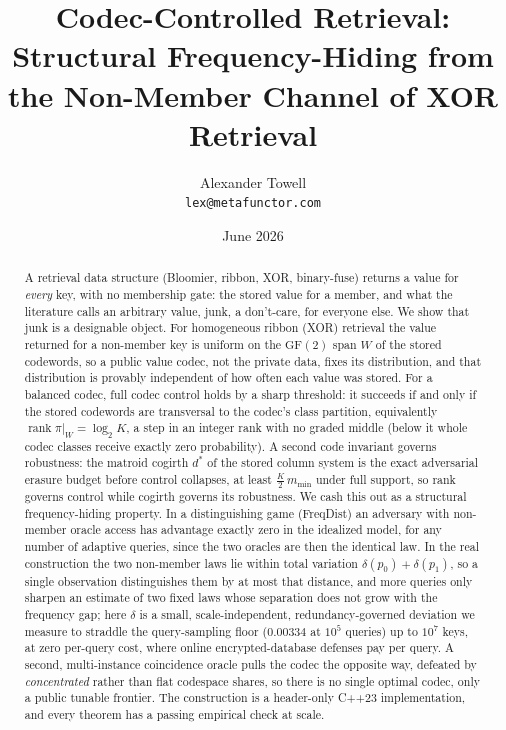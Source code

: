 \documentclass[11pt]{article}
\title{Codec-Controlled Retrieval:\\
Structural Frequency-Hiding from the Non-Member Channel of XOR Retrieval}
\author{Alexander Towell\\\texttt{lex@metafunctor.com}}
\date{June 2026}
\theoremstyle{definition}
\theoremstyle{plain}
\theoremstyle{remark}
\newcommand{\GF}{\mathrm{GF}(2)}
\DeclareMathOperator{\rank}{rank}
\newcommand{\W}{W}                          %
\newcommand{\proj}{\pi}                     %
\begin{document}
\maketitle

\begin{abstract}
A retrieval data structure (Bloomier, ribbon, XOR, binary-fuse) returns a value
for \emph{every} key, with no membership gate: the stored value for a member, and
what the literature calls an arbitrary value, junk, a don't-care, for everyone else.
We show that junk is a designable object. For homogeneous ribbon (XOR) retrieval the
value returned for a non-member key is uniform on the $\GF$ span $\W$ of the stored
codewords, so a public value codec, not the private data, fixes its distribution, and
that distribution is provably independent of how often each value was stored. For a
balanced codec, full codec control holds by a sharp threshold: it succeeds if and only
if the stored codewords are transversal to the codec's class partition, equivalently
$\rank \proj|_{\W} = \log_2 K$, a step in an integer rank with no graded middle (below
it whole codec classes receive exactly zero probability). A second code invariant
governs robustness: the matroid cogirth $d^\ast$ of the stored column system is the
exact adversarial erasure budget before control collapses, at least
$\tfrac{K}{2}\,m_{\min}$ under full support, so rank governs control while cogirth
governs its robustness. We cash this out as a structural frequency-hiding property. In
a distinguishing game (FreqDist) an adversary with non-member oracle access has
advantage exactly zero in the idealized model, for any number of adaptive queries,
since the two oracles are then the identical law. In the real construction the two
non-member laws lie within total variation $\delta(p_0)+\delta(p_1)$, so a single
observation distinguishes them by at most that distance, and more queries only sharpen
an estimate of two fixed laws whose separation does not grow with the frequency gap; here $\delta$
is a small, scale-independent, redundancy-governed deviation we measure to straddle the
query-sampling floor ($0.00334$ at $10^5$ queries) up to $10^7$ keys, at zero per-query
cost, where online encrypted-database defenses pay per query. A second,
multi-instance coincidence oracle pulls the codec the opposite way, defeated by
\emph{concentrated} rather than flat codespace shares, so there is no single optimal
codec, only a public tunable frontier. The construction is a header-only C++23
implementation, and every theorem has a passing empirical check at scale.
\end{abstract}
\end{document}
